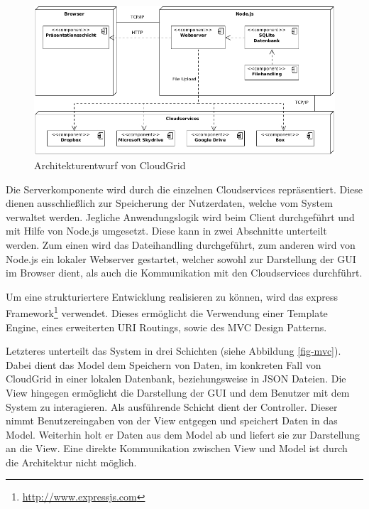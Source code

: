 \begin{figure}[H]
  \centering
  \includegraphics[width=\textwidth]{resources/Bilder_Kapitel_4/cloudgrid-architektur.jpg}
  \caption{Architekturentwurf von CloudGrid}
  \label{fig-architektur}
\end{figure}

Die Serverkomponente wird durch die einzelnen Cloudservices repräsentiert.
Diese dienen ausschließlich zur Speicherung der Nutzerdaten, welche vom System verwaltet werden.
Jegliche Anwendungslogik wird beim Client durchgeführt und mit Hilfe von Node.js umgesetzt.
Diese kann in zwei Abschnitte unterteilt werden.
Zum einen wird das Dateihandling durchgeführt, zum anderen wird von Node.js ein lokaler Webserver gestartet, welcher sowohl zur Darstellung der \ac{GUI} im Browser dient, als auch die Kommunikation mit den Cloudservices durchführt.

Um eine strukturiertere Entwicklung realisieren zu können, wird das express Framework\footnote{\url{http://www.expressjs.com}} verwendet.
Dieses ermöglicht die Verwendung einer Template Engine, eines erweiterten \ac{URI} Routings, sowie des \ac{MVC} Design Patterns.

Letzteres unterteilt das System in drei Schichten (siehe Abbildung \ref{fig-mvc}).
Dabei dient das Model dem Speichern von Daten, im konkreten Fall von CloudGrid in einer lokalen Datenbank, beziehungsweise in \ac{JSON} Dateien.
Die View hingegen ermöglicht die Darstellung der \ac{GUI} und dem Benutzer mit dem System zu interagieren.
Als ausführende Schicht dient der Controller.
Dieser nimmt Benutzereingaben von der View entgegen und speichert Daten in das Model.
Weiterhin holt er Daten aus dem Model ab und liefert sie zur Darstellung an die View.
Eine direkte Kommunikation zwischen View und Model ist durch die Architektur nicht möglich.

